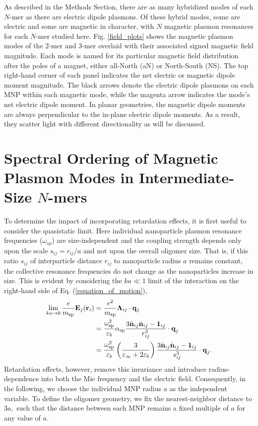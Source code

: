 \documentclass [11pt, proquest] {uwthesis}[2016/11/22]
\begin{document}
As described in the Methods Section, there are as many hybridized modes of each $N$-mer as there are electric dipole plasmons. Of these hybrid modes, some are electric and some are magnetic in character, with $N$ magnetic plasmon resonances for each $N$-mer studied here. Fig. \ref{field_plots} shows the magnetic plasmon modes of the 2-mer and 3-mer overlaid with their associated signed magnetic field magnitude. Each mode is named for its particular magnetic field distribution after the poles of a magnet, either all-North (aN) or North-South (NS). The top right-hand corner of each panel indicates the net electric or magnetic dipole moment magnitude. The black arrows denote the electric dipole plasmons on each MNP within each magnetic mode, while the magenta arrow indicates the mode's net electric dipole moment. In planar geometries, the magnetic dipole moments are always perpendicular to the in-plane electric dipole moments. As a result, they scatter light with different directionality as will be discussed.




\section{Spectral Ordering of Magnetic Plasmon Modes in Intermediate-Size $N$-mers}
To determine the impact of incorporating retardation effects, it is first useful to consider the quasistatic limit. Here individual nanoparticle plasmon resonance frequencies ($\omega_{sp}$) are size-independent and the coupling strength depends only upon the scale $s_{ij} = r_{ij}/a$ and not upon the overall oligomer size. That is, if this ratio $s_{ij}$ of interparticle distance $r_{ij}$ to nanoparticle radius $a$ remains constant, the collective resonance frequencies do not change as the nanoparticles increase in size. This is evident by considering the $ka\ll 1$ limit of the interaction on the right-hand side of Eq. (\ref{equation_of_motion}),
\begin{equation}
\begin{aligned}
\lim_{ka \to 0}\frac{e}{m_{\textrm{sp}}}\textbf{E}_j(\textbf{r}_i) &= \frac{e^2}{m_{\textrm{sp}}}\boldsymbol{\Lambda}_{ij}\cdot{\bf q}_j\\ 
&= \frac{\omega_{\textrm{sp}}^2}{\varepsilon_b}\alpha_{\textrm{sp}}\frac{3\hat{\textbf{n}}_{ij}\hat{\textbf{n}}_{ij} - \textbf{1}_{ij}}{r_{ij}^3} \cdot \textbf{q}_j \\
&= \frac{\omega_{\textrm{sp}}^2}{\varepsilon_b} \left(\frac{3}{\varepsilon_{\infty}+2\varepsilon_b}\right)\frac{3\hat{\textbf{n}}_{ij}\hat{\textbf{n}}_{ij} - \textbf{1}_{ij}}{s_{ij}^3} \cdot \textbf{q}_j.
\end{aligned}
\label{quasistatic_coupling}
\end{equation}
Retardation effects, however, remove this invariance and introduce radius-dependence into both the Mie frequency and the electric field. Consequently, in the following, we choose the individual MNP radius $a$ as the independent variable. To define the oligomer geometry, we fix the nearest-neighbor distance to $3a,$ such that the distance between each MNP remains a fixed multiple of $a$ for any value of $a.$
\end{document}
